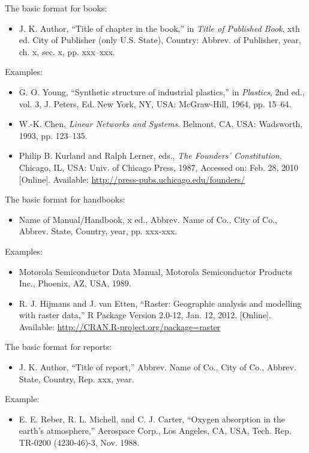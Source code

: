 \documentclass[11pt,a4paper]{article}
\begin{document}
The basic format for books:
\begin{itemize}
    \item J. K. Author, “Title of chapter in the book,” in \textit{Title of Published Book}, xth ed. City of Publisher (only U.S. State), Country: Abbrev. of Publisher, year, ch. x, sec. x, pp. xxx–xxx.
\end{itemize}
Examples:
\begin{itemize}
    \item G. O. Young, “Synthetic structure of industrial plastics,” in \textit{Plastics}, 2nd ed., vol. 3, J. Peters, Ed. New York, NY, USA: McGraw-Hill, 1964, pp. 15–64.
    \item W.-K. Chen, \textit{Linear Networks and Systems}. Belmont, CA, USA: Wadsworth, 1993, pp. 123–135.
    \item Philip B. Kurland and Ralph Lerner, eds., \textit{The Founders’ Constitution}. Chicago, IL, USA: Univ. of Chicago Press, 1987, Accessed on: Feb. 28, 2010 [Online]. Available: \url{http://press-pubs.uchicago.edu/founders/}
\end{itemize}

The basic format for handbooks:
\begin{itemize}
    \item Name of Manual/Handbook, x ed., Abbrev. Name of Co., City of Co., Abbrev. State, Country, year, pp. xxx-xxx.
\end{itemize}
Examples:
\begin{itemize}
    \item Motorola Semiconductor Data Manual, Motorola Semiconductor Products Inc., Phoenix, AZ, USA, 1989.
    \item R. J. Hijmans and J. van Etten, “Raster: Geographic analysis and modelling with raster data,” R Package Version 2.0-12, Jan. 12, 2012. [Online]. Available: \url{http://CRAN.R-project.org/package=raster}
\end{itemize}

The basic format for reports:
\begin{itemize}
    \item J. K. Author, “Title of report,” Abbrev. Name of Co., City of Co., Abbrev. State, Country, Rep. xxx, year.
\end{itemize}
Example:
\begin{itemize}
    \item E. E. Reber, R. L. Michell, and C. J. Carter, “Oxygen absorption in the earth’s atmosphere,” Aerospace Corp., Los Angeles, CA, USA, Tech. Rep. TR-0200 (4230-46)-3, Nov. 1988.
\end{itemize}
\end{document}
